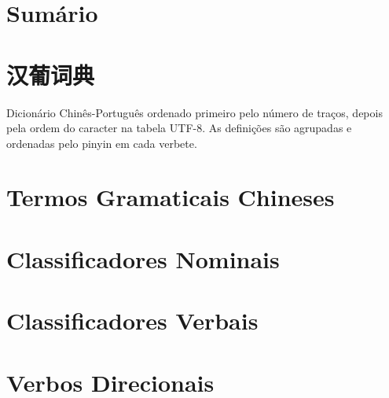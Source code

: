 \documentclass[a4paper,9pt,twoside,openright]{memoir}
\begin{document}



\clearpage
\pagestyle{empty}
\chapter{Sumário}                                                           
\begin{KeepFromToc}
 \renewcommand{\contentsname}{}%
 \tableofcontents
\end{KeepFromToc}

\clearpage
\pagestyle{empty}
\chapter{汉葡词典}

%
%

Dicionário Chinês-Português ordenado primeiro pelo número de traços,
depois pela ordem do caracter na tabela UTF-8.  As definições são
agrupadas e ordenadas pelo pinyin em cada verbete.

\clearpage
\pagestyle{dictionary}
\ifdraftdoc 

\else

\fi

\pagestyle{plain}

\ifdraftdoc 
%
%
%
\else

\clearpage
\chapter{Termos Gramaticais Chineses}


\clearpage
\chapter{Classificadores Nominais}


\clearpage
\chapter{Classificadores Verbais}


\clearpage
\chapter{Verbos Direcionais}

\end{document}
